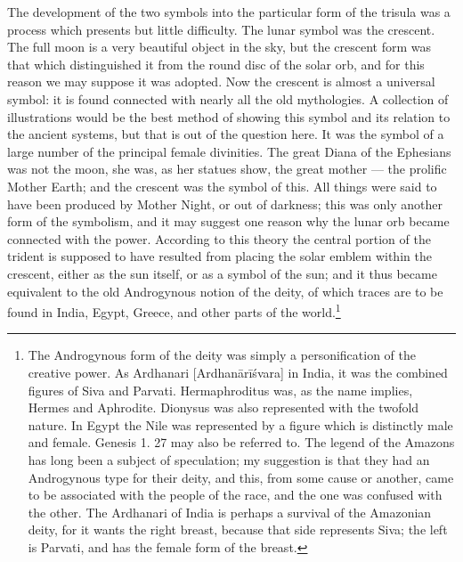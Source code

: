 \documentclass[a4paper, 11pt, oneside, english]{article}
\begin{document}
The development of the two symbols into the particular form of the trisula was a process which presents but little difficulty. The lunar symbol was the crescent. The full moon is a very beautiful object in the sky, but the crescent form was that which distinguished it from the round disc of the solar orb, and for this reason we may suppose it was adopted. Now the crescent is almost a universal symbol: it is found connected with nearly all the old mythologies. A collection of illustrations would be the best method of showing this symbol and its relation to the ancient systems, but that is out of the question here. It was the symbol of a large number of the principal female divinities. The great Diana of the Ephesians was not the moon, she was, as her statues show, the great mother --- the prolific Mother Earth; and the crescent was the symbol of this. All things were said to have been produced by Mother Night, or out of darkness; this was only another form of the symbolism, and it may suggest one reason why the lunar orb became connected with the power. According to this theory the central portion of the trident is supposed to have resulted from placing the solar emblem within the crescent, either as the sun itself, or as a symbol of the sun; and it thus became equivalent to the old Androgynous notion of the deity, of which traces are to be found in India, Egypt, Greece, and other parts of the world.\footnote{The Androgynous form of the deity was simply a personification of the creative power. As Ardhanari [Ardhanārīśvara] in India, it was the combined figures of Siva and Parvati. Hermaphroditus was, as the name implies, Hermes and Aphrodite. Dionysus was also represented with the twofold nature. In Egypt the Nile was represented by a figure which is distinctly male and female. Genesis 1. 27 may also be referred to. The legend of the Amazons has long been a subject of speculation; my suggestion is that they had an Androgynous type for their deity, and this, from some cause or another, came to be associated with the people of the race, and the one was confused with the other. The Ardhanari of India is perhaps a survival of the Amazonian deity, for it wants the right breast, because that side represents Siva; the left is Parvati, and has the female form of the breast.}
\end{document}
